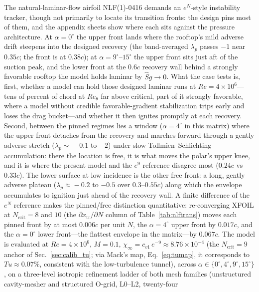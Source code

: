\documentclass[journal]{new-aiaa}
\begin{document}
The natural-laminar-flow airfoil NLF(1)-0416 demands an $e^N$-style
instability tracker, though not primarily to locate its transition
fronts: the design pins most of them, and the appendix sheets show
where each sits against the pressure architecture. At
$\alpha\!=\!0^\circ$ the upper front lands where the rooftop's mild
adverse drift steepens into the designed recovery (the band-averaged
$\lambda_p$ passes $-1$ near $0.35c$; the front is at $0.38c$); at
$\alpha\!=\!9^\circ$--$15^\circ$ the upper front sits just aft of the
suction peak, and the lower front at the $0.6c$ recovery wall behind a
strongly favorable rooftop the model holds laminar by $\hat S g\!\to\!0$.
What the case tests is, first, whether a model can hold those designed
laminar runs at $Re\!=\!4\!\times\!10^6$---tens of percent of chord at
$Re_\theta$ far above critical, part of it strongly favorable, where a
model without credible favorable-gradient stabilization trips early and
loses the drag bucket---and whether it then ignites promptly at each
recovery. Second, between the pinned regimes lies a window
($\alpha\!=\!4^\circ$ in this matrix) where the upper front detaches
from the recovery and marches forward through a gently adverse stretch
($\lambda_p\!\sim\!-0.1$ to $-2$) under slow Tollmien--Schlichting
accumulation: there the location is free, it is what moves the polar's
upper knee, and it is where the present model and the $e^9$ reference
disagree most ($0.24c$ vs $0.33c$). The lower surface at low incidence
is the other free front: a long, gently adverse plateau
($\lambda_p\!\approx\!-0.2$ to $-0.5$ over $0.3$--$0.55c$) along which
the envelope accumulates to ignition just ahead of the recovery wall.
A finite difference of the $e^N$ reference makes the pinned/free
distinction quantitative: re-converging XFOIL at
$N_\mathrm{crit}\!=\!8$ and $10$
(the $\partial x_\mathrm{tr}/\partial N$ column of
Table~\ref{tab:nlftrans}) moves each pinned front by at most $0.006c$
per unit $N$, the $\alpha\!=\!4^\circ$ upper front by $0.017c$, and
the $\alpha\!=\!0^\circ$ lower front---the flattest envelope in the
matrix---by $0.067c$. The model is evaluated at $Re\!=\!4\!\times\!10^6$, $M\!=\!0.1$,
$\chi_\infty\!=\!c_{v1}\,e^{-9}\!\approx\!8.76\!\times\!10^{-4}$
(the $N_\mathrm{crit}\!=\!9$ anchor of Sec.~\ref{sec:calib_tu}; via Mack's
map, Eq.~\eqref{eq:tumap}, it corresponds to $Tu\!\approx\!0.07\%$, consistent
with the low-turbulence tunnel), across
$\alpha\!\in\!\{0^\circ, 4^\circ, 9^\circ,
15^\circ\}$, on a three-level isotropic refinement ladder of both mesh families
(unstructured cavity-mesher and structured O-grid, L0--L2, twenty-four
\end{document}
